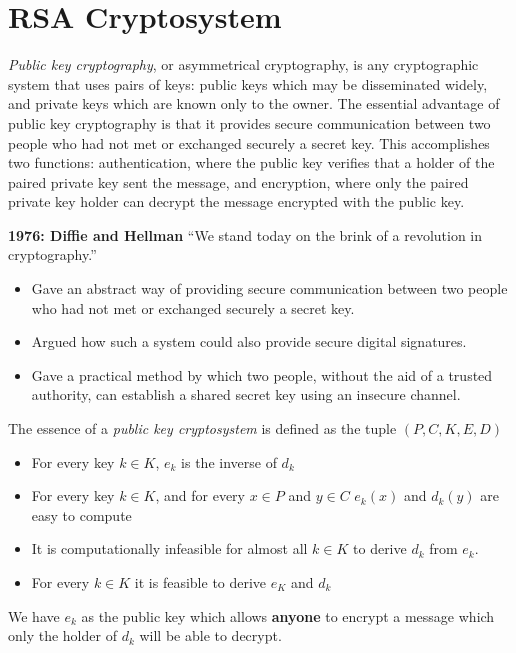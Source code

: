 \section{RSA Cryptosystem}
\textit{Public key cryptography}, or asymmetrical cryptography,
is any cryptographic system that uses pairs of keys: public keys which may be disseminated widely,
and private keys which are known only to the owner.
The essential advantage of public key cryptography is that it provides secure communication between two people who had not met or exchanged securely a secret key.
This accomplishes two functions: authentication, where the public key verifies that a holder of the paired private key sent the message,
and encryption, where only the paired private key holder can decrypt the message encrypted with the public key.

\textbf{1976: Diffie and Hellman}
“We stand today on the brink of a revolution in cryptography.”
\begin{itemize}
    \item Gave an abstract way of providing secure communication between two people who had not met or exchanged securely a secret key.
    \item Argued how such a system could also provide secure digital signatures.
    \item Gave a practical method by which two people, without the aid of a trusted authority, can
        establish a shared secret key using an insecure channel.
\end{itemize}

\begin{definition}
    The essence of a \textit{public key cryptosystem} is defined as the tuple
    $(P,C,K,E,D)$
    \begin{itemize}
        \item For every key $k \in K$, $e_k$ is the inverse of $d_k$
        \item For every key $k \in K$,
            and for every $x \in P$ and $y \in C$
            $e_k(x)$ and $d_k(y)$ are easy to compute
        \item It is computationally infeasible for almost all $k \in K$
            to derive $d_k$ from $e_k$.
        \item For every $k \in K$ it is feasible to derive $e_K$ and $d_k$
    \end{itemize}
    We have $e_k$ as the public key which allows \textbf{anyone} to encrypt a message
    which only the holder of $d_k$ will be able to decrypt.
\end{definition}


